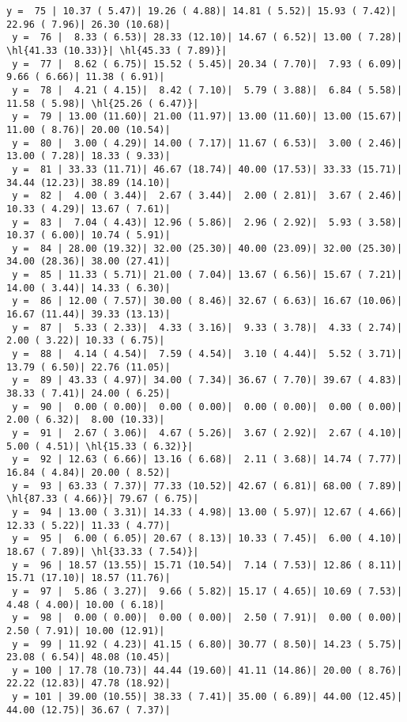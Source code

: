 \documentclass[10pt]{article}
\newcommand{\hl}[1]{\textcolor{blue}{#1}}
\begin{document}
\begin{Verbatim}[fontsize=\small, commandchars=\\\{\}]
 y =  75 | 10.37 ( 5.47)| 19.26 ( 4.88)| 14.81 ( 5.52)| 15.93 ( 7.42)| 22.96 ( 7.96)| 26.30 (10.68)|
 y =  76 |  8.33 ( 6.53)| 28.33 (12.10)| 14.67 ( 6.52)| 13.00 ( 7.28)| \hl{41.33 (10.33)}| \hl{45.33 ( 7.89)}|
 y =  77 |  8.62 ( 6.75)| 15.52 ( 5.45)| 20.34 ( 7.70)|  7.93 ( 6.09)|  9.66 ( 6.66)| 11.38 ( 6.91)|
 y =  78 |  4.21 ( 4.15)|  8.42 ( 7.10)|  5.79 ( 3.88)|  6.84 ( 5.58)| 11.58 ( 5.98)| \hl{25.26 ( 6.47)}|
 y =  79 | 13.00 (11.60)| 21.00 (11.97)| 13.00 (11.60)| 13.00 (15.67)| 11.00 ( 8.76)| 20.00 (10.54)|
 y =  80 |  3.00 ( 4.29)| 14.00 ( 7.17)| 11.67 ( 6.53)|  3.00 ( 2.46)| 13.00 ( 7.28)| 18.33 ( 9.33)|
 y =  81 | 33.33 (11.71)| 46.67 (18.74)| 40.00 (17.53)| 33.33 (15.71)| 34.44 (12.23)| 38.89 (14.10)|
 y =  82 |  4.00 ( 3.44)|  2.67 ( 3.44)|  2.00 ( 2.81)|  3.67 ( 2.46)| 10.33 ( 4.29)| 13.67 ( 7.61)|
 y =  83 |  7.04 ( 4.43)| 12.96 ( 5.86)|  2.96 ( 2.92)|  5.93 ( 3.58)| 10.37 ( 6.00)| 10.74 ( 5.91)|
 y =  84 | 28.00 (19.32)| 32.00 (25.30)| 40.00 (23.09)| 32.00 (25.30)| 34.00 (28.36)| 38.00 (27.41)|
 y =  85 | 11.33 ( 5.71)| 21.00 ( 7.04)| 13.67 ( 6.56)| 15.67 ( 7.21)| 14.00 ( 3.44)| 14.33 ( 6.30)|
 y =  86 | 12.00 ( 7.57)| 30.00 ( 8.46)| 32.67 ( 6.63)| 16.67 (10.06)| 16.67 (11.44)| 39.33 (13.13)|
 y =  87 |  5.33 ( 2.33)|  4.33 ( 3.16)|  9.33 ( 3.78)|  4.33 ( 2.74)|  2.00 ( 3.22)| 10.33 ( 6.75)|
 y =  88 |  4.14 ( 4.54)|  7.59 ( 4.54)|  3.10 ( 4.44)|  5.52 ( 3.71)| 13.79 ( 6.50)| 22.76 (11.05)|
 y =  89 | 43.33 ( 4.97)| 34.00 ( 7.34)| 36.67 ( 7.70)| 39.67 ( 4.83)| 38.33 ( 7.41)| 24.00 ( 6.25)|
 y =  90 |  0.00 ( 0.00)|  0.00 ( 0.00)|  0.00 ( 0.00)|  0.00 ( 0.00)|  2.00 ( 6.32)|  8.00 (10.33)|
 y =  91 |  2.67 ( 3.06)|  4.67 ( 5.26)|  3.67 ( 2.92)|  2.67 ( 4.10)|  5.00 ( 4.51)| \hl{15.33 ( 6.32)}|
 y =  92 | 12.63 ( 6.66)| 13.16 ( 6.68)|  2.11 ( 3.68)| 14.74 ( 7.77)| 16.84 ( 4.84)| 20.00 ( 8.52)|
 y =  93 | 63.33 ( 7.37)| 77.33 (10.52)| 42.67 ( 6.81)| 68.00 ( 7.89)| \hl{87.33 ( 4.66)}| 79.67 ( 6.75)|
 y =  94 | 13.00 ( 3.31)| 14.33 ( 4.98)| 13.00 ( 5.97)| 12.67 ( 4.66)| 12.33 ( 5.22)| 11.33 ( 4.77)|
 y =  95 |  6.00 ( 6.05)| 20.67 ( 8.13)| 10.33 ( 7.45)|  6.00 ( 4.10)| 18.67 ( 7.89)| \hl{33.33 ( 7.54)}|
 y =  96 | 18.57 (13.55)| 15.71 (10.54)|  7.14 ( 7.53)| 12.86 ( 8.11)| 15.71 (17.10)| 18.57 (11.76)|
 y =  97 |  5.86 ( 3.27)|  9.66 ( 5.82)| 15.17 ( 4.65)| 10.69 ( 7.53)|  4.48 ( 4.00)| 10.00 ( 6.18)|
 y =  98 |  0.00 ( 0.00)|  0.00 ( 0.00)|  2.50 ( 7.91)|  0.00 ( 0.00)|  2.50 ( 7.91)| 10.00 (12.91)|
 y =  99 | 11.92 ( 4.23)| 41.15 ( 6.80)| 30.77 ( 8.50)| 14.23 ( 5.75)| 23.08 ( 6.54)| 48.08 (10.45)|
 y = 100 | 17.78 (10.73)| 44.44 (19.60)| 41.11 (14.86)| 20.00 ( 8.76)| 22.22 (12.83)| 47.78 (18.92)|
 y = 101 | 39.00 (10.55)| 38.33 ( 7.41)| 35.00 ( 6.89)| 44.00 (12.45)| 44.00 (12.75)| 36.67 ( 7.37)|
\end{Verbatim}
\end{document}
